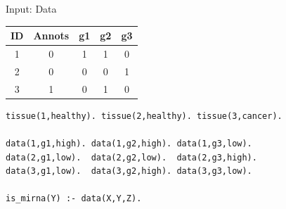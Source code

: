 \documentclass[10pt,dvipsnames]{beamer}
\begin{document}
\begin{frame}[fragile]{Input: Data}
\begin{center}
\begin{tabular}{|c|c|c|c|c|}
\hline
ID&	Annots&	g1&	g2&	g3\\
\hline
1&	0&	1&	1&	0\\
2&	0&	0&	0&	1\\
3&	1&	0&	1&	0\\
\hline
\end{tabular}
\end{center}
\vspace{0.2cm}
\color{my_example_color}
\begin{verbatim}
tissue(1,healthy). tissue(2,healthy). tissue(3,cancer).
 
data(1,g1,high). data(1,g2,high). data(1,g3,low).
data(2,g1,low).  data(2,g2,low).  data(2,g3,high).
data(3,g1,low).  data(3,g2,high). data(3,g3,low).
 
is_mirna(Y) :- data(X,Y,Z).
\end{verbatim}
\end{frame}
\end{document}
